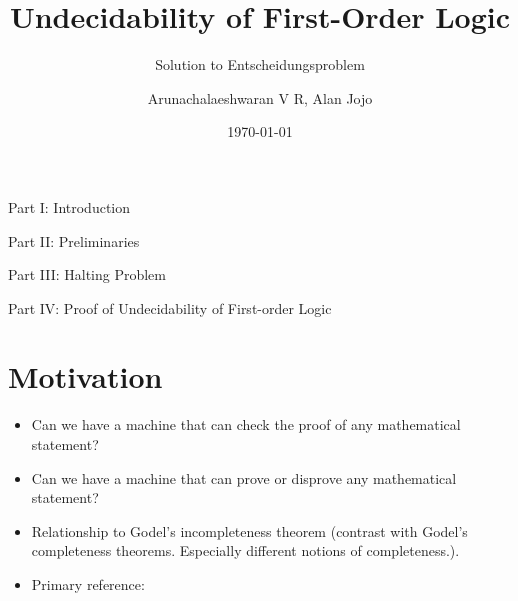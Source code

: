 \documentclass[
11pt,notheorems,hyperref={pdfauthor=whatever}
]{beamer}
\title[
]{Undecidability of First-Order Logic}
\subtitle{Solution to Entscheidungsproblem}
\author[
]{
    Arunachalaeshwaran V R,
    Alan Jojo
}
\institute{
    Indian Institute of Science}
\date{\today}
\begin{document}
{
\begin{frame}
  \titlepage
\end{frame}
}
\addtocounter{framenumber}{-1}

\begin{frame}{Part I: Introduction}
    \tableofcontents[part=1]
\end{frame}
\begin{frame}{Part II: Preliminaries}
    \tableofcontents[part=2]
\end{frame}
\begin{frame}{Part III: Halting Problem}
    \tableofcontents[part=3]
\end{frame}
\begin{frame}{Part IV: Proof of Undecidability of First-order Logic}
    \tableofcontents[part=4]
\end{frame}


\section{Motivation}
\begin{frame}
\begin{itemize}
    \item Can we have a machine that can check the proof of any mathematical statement?
    \item Can we have a machine that can prove or disprove any mathematical statement?
    \item Relationship to Godel's incompleteness theorem (contrast with Godel's completeness theorems. Especially different notions of completeness.).
    \item Primary reference: \cite{boolos2002computability}
\end{itemize}     
\end{frame}
\end{document}
